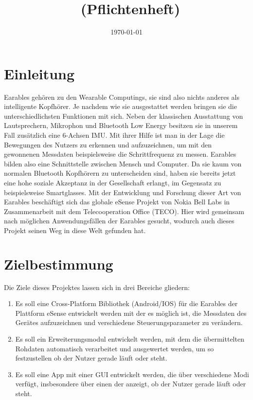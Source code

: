 \documentclass[a4paper,12pt]{article}
\title{\projektName~(Pflichtenheft)}
\author{\authorName}
\date{\today}
\begin{document}
 \setcounter{page}{2}
 \tableofcontents          %
 \clearpage

\section{Einleitung}
\Gls{Earables} gehören zu den \Gls{Wearable Computings}, sie sind also nichts anderes als intelligente Kopfhörer. Je nachdem wie sie ausgestattet werden bringen sie die unterschiedlichsten Funktionen mit sich. Neben der klassischen Ausstattung von Lautsprechern, Mikrophon und Bluetooth Low Energy besitzen sie in unserem Fall zusätzlich eine \Gls{6-Achsen IMU}. Mit ihrer Hilfe ist man in der Lage die Bewegungen des Nutzers zu erkennen und aufzuzeichnen, um mit den gewonnenen Messdaten  beispielsweise die Schrittfrequenz zu messen.  \Gls{Earables} bilden also eine Schnittstelle zwischen Mensch und Computer. Da sie kaum von normalen Bluetooth Kopfhörern zu unterscheiden sind, haben sie bereits jetzt eine hohe soziale Akzeptanz in der Gesellschaft erlangt, im Gegensatz zu beispielsweise Smartglasses. Mit der Entwicklung und Forschung dieser Art von \Gls{Earables} beschäftigt sich das globale eSense Projekt von Nokia Bell Labs in Zusammenarbeit mit dem Telecooperation Office (TECO). Hier wird gemeinsam nach möglichen Anwendungsfällen der \Gls{Earables} gesucht, wodurch auch dieses Projekt seinen Weg in diese Welt gefunden hat. %
\section{Zielbestimmung}
Die Ziele dieses Projektes lassen sich in drei Bereiche gliedern:
\begin{enumerate}

  \item Es soll eine \Gls{Cross-Platform Bibliothek} (Android/IOS) für die \Gls{Earables} der Plattform eSense entwickelt werden mit der es möglich ist, die Messdaten des Gerätes aufzuzeichnen und verschiedene \Gls{Steuerungsparameter} zu verändern.
  
  \item Es soll ein Erweiterungsmodul entwickelt werden, mit dem die übermittelten  \Gls{Rohdaten} automatisch verarbeitet und ausgewertet werden, um so festzustellen ob der Nutzer gerade läuft oder steht.
  
  \item Es soll eine App mit einer \Gls{GUI} entwickelt werden, die über verschiedene Modi verfügt, insbesondere über einen der anzeigt, ob der Nutzer gerade läuft oder steht. 

\end{enumerate}
\end{document}
